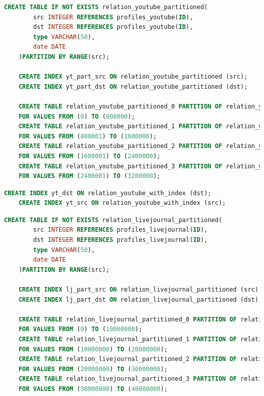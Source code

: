 \begin{lstlisting}[language=SQL,caption=Erstellen von partitionierten Tabellen mit Index youtube,frame=single, label={parttableindexyoutube}]
    CREATE TABLE IF NOT EXISTS relation_youtube_partitioned(
        src INTEGER REFERENCES profiles_youtube(ID),
        dst INTEGER REFERENCES profiles_youtube(ID),
        type VARCHAR(50),
        date DATE
    )PARTITION BY RANGE(src);

    CREATE INDEX yt_part_src ON relation_youtube_partitioned (src);
    CREATE INDEX yt_part_dst ON relation_youtube_partitioned (dst);

    CREATE TABLE relation_youtube_partitioned_0 PARTITION OF relation_youtube_partitioned
    FOR VALUES FROM (0) TO (800000);
    CREATE TABLE relation_youtube_partitioned_1 PARTITION OF relation_youtube_partitioned
    FOR VALUES FROM (800001) TO (1600000);
    CREATE TABLE relation_youtube_partitioned_2 PARTITION OF relation_youtube_partitioned
    FOR VALUES FROM (1600001) TO (2400000);
    CREATE TABLE relation_youtube_partitioned_3 PARTITION OF relation_youtube_partitioned
    FOR VALUES FROM (2400001) TO (3200000);
\end{lstlisting}

\begin{lstlisting}[language=SQL,caption=Erstellen von Indexen auf relation Tabelle youtube,frame=single, label={indexyoutube}]
    CREATE INDEX yt_dst ON relation_youtube_with_index (dst);
    CREATE INDEX yt_src ON relation_youtube_with_index (src);
\end{lstlisting}

\begin{lstlisting}[language=SQL,caption=Erstellen von partitionierten Tabellen mit Index livejournal,frame=single, label={parttableindexlivejournal}]
    CREATE TABLE IF NOT EXISTS relation_livejournal_partitioned(
        src INTEGER REFERENCES profiles_livejournal(ID),
        dst INTEGER REFERENCES profiles_livejournal(ID),
        type VARCHAR(50),
        date DATE
    )PARTITION BY RANGE(src);

    CREATE INDEX lj_part_src ON relation_livejournal_partitioned (src);
    CREATE INDEX lj_part_dst ON relation_livejournal_partitioned (dst);

    CREATE TABLE relation_livejournal_partitioned_0 PARTITION OF relation_livejournal_partitioned
    FOR VALUES FROM (0) TO (10000000);
    CREATE TABLE relation_livejournal_partitioned_1 PARTITION OF relation_livejournal_partitioned
    FOR VALUES FROM (10000000) TO (20000000);
    CREATE TABLE relation_livejournal_partitioned_2 PARTITION OF relation_livejournal_partitioned
    FOR VALUES FROM (20000000) TO (30000000);
    CREATE TABLE relation_livejournal_partitioned_3 PARTITION OF relation_livejournal_partitioned
    FOR VALUES FROM (30000000) TO (40000000);
\end{lstlisting}

